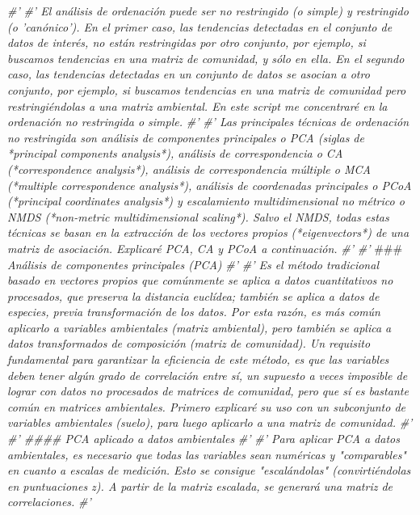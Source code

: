 \documentclass[11pt,]{article}
\newenvironment{Shaded}{\begin{snugshade}}{\end{snugshade}}
\newcommand{\CommentTok}[1]{\textcolor[rgb]{0.56,0.35,0.01}{\textit{#1}}}
\newcommand{\AlertTok}[1]{\textcolor[rgb]{0.94,0.16,0.16}{#1}}
\begin{document}
\begin{Shaded}
\begin{Highlighting}[]
{\CommentTok{#' }
\CommentTok{#' El análisis de ordenación puede ser no restringido (o simple) y restringido (o 'canónico'). En el primer caso, las tendencias detectadas en el conjunto de datos de interés, no están restringidas por otro conjunto, por ejemplo, si buscamos tendencias en una matriz de comunidad, y sólo en ella. En el segundo caso, las tendencias detectadas en un conjunto de datos se asocian a otro conjunto, por ejemplo, si buscamos tendencias en una matriz de comunidad pero restringiéndolas a una matriz ambiental. En este script me concentraré en la ordenación no restringida o simple.}
\CommentTok{#' }
\CommentTok{#' Las principales técnicas de ordenación no restringida son análisis de componentes principales o PCA (siglas de *principal components analysis*), análisis de correspondencia o CA (*correspondence analysis*), análisis de correspondencia múltiple o MCA (*multiple correspondence analysis*), análisis de coordenadas principales o PCoA (*principal coordinates analysis*) y escalamiento multidimensional no métrico o NMDS (*non-metric multidimensional scaling*). Salvo el NMDS, todas estas técnicas se basan en la extracción de los vectores propios (*eigenvectors*) de una matriz de asociación. Explicaré PCA, CA y PCoA a continuación.}
\CommentTok{#' }
\CommentTok{#' }\AlertTok{###}\CommentTok{ Análisis de componentes principales (PCA)}
\CommentTok{#' }
\CommentTok{#' Es el método tradicional basado en vectores propios que comúnmente se aplica a datos cuantitativos no procesados, que preserva la distancia euclídea; también se aplica a datos de especies, previa transformación de los datos. Por esta razón, es más común aplicarlo a variables ambientales (matriz ambiental), pero también se aplica a datos transformados de composición (matriz de comunidad). Un requisito fundamental para garantizar la eficiencia de este método, es que las variables deben tener algún grado de correlación entre sí, un supuesto a veces imposible de lograr con datos no procesados de matrices de comunidad, pero que sí es bastante común en matrices ambientales. Primero explicaré su uso con un subconjunto de variables ambientales (suelo), para luego aplicarlo a una matriz de comunidad.}
\CommentTok{#' }
\CommentTok{#' #### PCA aplicado a datos ambientales}
\CommentTok{#' }
\CommentTok{#' Para aplicar PCA a datos ambientales, es necesario que todas las variables sean numéricas y "comparables" en cuanto a escalas de medición. Esto se consigue "escalándolas" (convirtiéndolas en puntuaciones z). A partir de la matriz escalada, se generará una matriz de correlaciones.}
\CommentTok{#' }
}
\end{Highlighting}
\end{Shaded}
\end{document}
